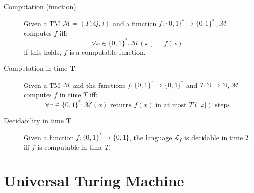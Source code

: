 \begin{description}
    \item[Computation (function)] 
        Given a TM $\mathcal{M} = (\Gamma, Q, \delta)$ and a function $f: \{0, 1\}^* \rightarrow \{0, 1\}^*$, 
        $\mathcal{M}$ computes $f$ iff:
        \[ \forall x \in \{0, 1\}^*: \mathcal{M}(x) = f(x) \]
        If this holds, $f$ is a computable function.

    \item[Computation in time $\mathbf{T}$] 
        Given a TM $\mathcal{M}$ and 
        the functions $f: \{0, 1\}^* \rightarrow \{0, 1\}^*$ and
        $T: \mathbb{N} \rightarrow \mathbb{N}$,
        $\mathcal{M}$ computes $f$ in time $T$ iff:
        \[ \forall x \in \{0, 1\}^*: \text{$\mathcal{M}(x)$ returns $f(x)$ in at most $T(\vert x \vert)$ steps} \]

    \item[Decidability in time $\mathbf{T}$] 
        Given a function $f: \{0, 1\}^* \rightarrow \{0, 1\}$,
        the language $\mathcal{L}_f$ is decidable in time $T$ iff $f$ is computable in time $T$.
\end{description}



\section{Universal Turing Machine}

